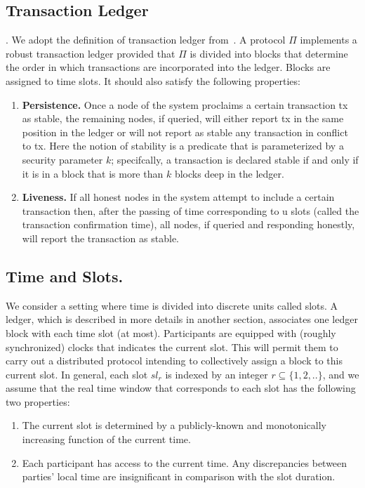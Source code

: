 \subsection{Transaction Ledger}\label{subsec:transaction-ledger}.
We adopt the definition of transaction ledger from~\cite{cryptoeprint:2016/889}.
A protocol $\Pi$ implements a robust transaction ledger provided that $\Pi$ is divided into blocks that determine the order in which transactions are incorporated into the ledger.
Blocks are assigned to time slots.
It should also satisfy the following properties:
\begin{enumerate}
    \item \textbf{Persistence.} Once a node of the system proclaims a certain transaction tx as stable, the remaining
    nodes, if queried, will either report tx in the same position in the ledger or will not report as stable any transaction in conflict to tx.
    Here the notion of stability is a predicate that is parameterized by a security parameter $k$; specifcally, a transaction is declared stable if and only if it is in a block that is more than $k$ blocks deep in the ledger.
    \item \textbf{Liveness.} If all honest nodes in the system attempt to include a certain transaction then, after the passing of time corresponding to u slots (called the transaction confirmation time), all nodes, if queried and responding honestly, will report the transaction as stable.
\end{enumerate}

\subsection{Time and Slots.}\label{subsec:time-and-slots.}
We consider a setting where time is divided into discrete units called slots.
A ledger, which is described in more details in another section, associates one ledger block with each time slot (at most).
Participants are equipped with (roughly synchronized) clocks that indicates the current slot.
This will permit them to carry out a distributed protocol intending to collectively assign a block to this current
slot.
In general, each slot $sl_r$ is indexed by an integer $r \subseteq \{1, 2, ..\}$, and we assume that the real
time window that corresponds to each slot has the following two properties:
\begin{enumerate}
    \item The current slot is determined by a publicly-known and monotonically increasing function of the current time.
    \item Each participant has access to the current time.
    Any discrepancies between parties' local time are insignificant in comparison with the slot duration.
\end{enumerate}

